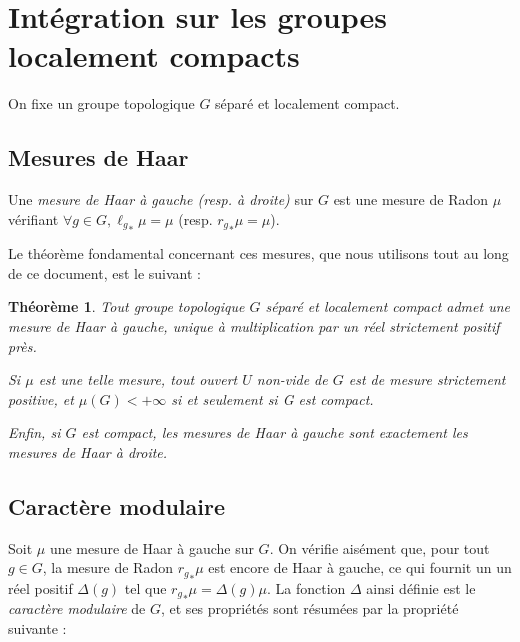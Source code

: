 \documentclass[a4paper,12pt]{article}
\newtheorem{theorem}{Théorème}[section]
\newcommand{\ssi}{si et seulement si }
\begin{document}
\section{Intégration sur les groupes localement compacts}\label{appendix_integration}

On fixe un groupe topologique $G$ séparé et localement compact.

\subsection*{Mesures de Haar}

Une \emph{mesure de Haar à gauche (resp. à droite)} sur $G$
est une mesure de Radon $\mu$ vérifiant $\forall g\in G, {\ell_g}_*\mu = \mu$ (resp. ${r_g}_*\mu = \mu$).

Le théorème fondamental concernant ces mesures, que nous utilisons tout au long de ce document, est le suivant :
\begin{theorem}\label{theorem_Haar}
    Tout groupe topologique $G$ séparé et localement compact admet une mesure de Haar à gauche, unique à multiplication par un réel strictement 
    positif près. 
    
    Si $\mu$ est une telle mesure, tout ouvert $U$ non-vide de $G$ est de mesure strictement positive,
    et $\mu(G)<+\infty$ \ssi G est compact.

    Enfin, si $G$ est compact, les mesures de Haar à gauche sont exactement les mesures de Haar à droite.
\end{theorem}

\subsection*{Caractère modulaire}

Soit $\mu$ une mesure de Haar à gauche sur $G$. On vérifie aisément que, pour tout $g\in G$, la
mesure de Radon ${r_g}_*\mu$ est encore de Haar à gauche, ce qui fournit un un réel positif $\Delta(g)$ tel que 
${r_g}_*\mu = \Delta(g)\mu$. La fonction $\Delta$ ainsi définie est le \emph{caractère modulaire} de $G$,
et ses propriétés sont résumées par la propriété suivante :
\end{document}

